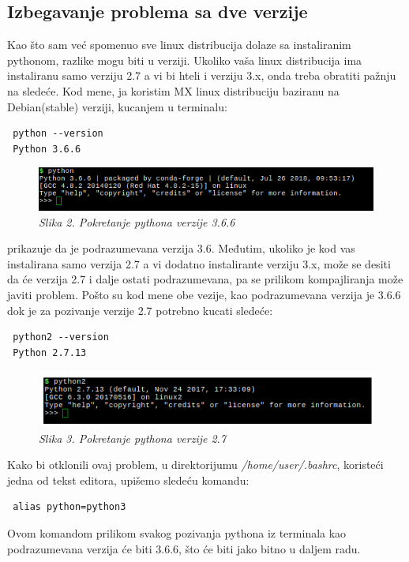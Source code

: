 \documentclass[12pt]{article}
\begin{document}
\subsection{Izbegavanje problema sa dve verzije}
Kao što sam već spomenuo sve linux distribucija dolaze sa instaliranim pythonom, razlike mogu biti u verziji. Ukoliko vaša linux distribucija ima instaliranu samo verziju 2.7 a vi bi hteli i verziju 3.x, onda treba obratiti pažnju na sledeće. Kod mene, ja koristim MX linux distribuciju baziranu na Debian(stable) verziji, kucanjem u terminalu:
\begin{lstlisting}
 python --version
 Python 3.6.6
\end{lstlisting}  
\begin{figure}[h!]
\centering
\includegraphics[width=1.\linewidth]{python3.png}
\caption*{\textsl{Slika 2. Pokretanje pythona verzije 3.6.6}}
\end{figure}
prikazuje da je podrazumevana verzija 3.6. Međutim, ukoliko je kod vas instalirana samo verzija 2.7 a vi dodatno instalirante verziju 3.x, može se desiti da će verzija 2.7 i dalje ostati podrazumevana, pa se prilikom kompajliranja može javiti problem. Pošto su kod mene obe vezije, kao podrazumevana verzija je 3.6.6 dok je za pozivanje verzije 2.7 potrebno kucati sledeće:
\begin{lstlisting}
 python2 --version
 Python 2.7.13
\end{lstlisting}
\begin{figure}[h!]
\centering
\includegraphics[width=1.\linewidth]{python2.png}
\caption*{\textsl{Slika 3. Pokretanje pythona verzije 2.7}}
\end{figure}
  Kako bi otklonili ovaj problem, u direktorijumu \textsl{/home/user/.bashrc}, koristeći jedna od tekst editora, upišemo sledeću komandu:
\begin{lstlisting}
 alias python=python3
\end{lstlisting}  
Ovom komandom prilikom svakog pozivanja pythona iz terminala kao podrazumevana verzija će biti 3.6.6, što će biti jako bitno u daljem radu.
\end{document}
